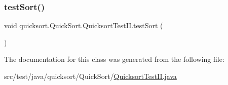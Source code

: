 \subsubsection{\texorpdfstring{test\+Sort()}{testSort()}}
{\footnotesize\ttfamily void quicksort.\+Quick\+Sort.\+Quicksort\+Test\+I\+I.\+test\+Sort (\begin{DoxyParamCaption}{ }\end{DoxyParamCaption})}



The documentation for this class was generated from the following file\+:\begin{DoxyCompactItemize}
\item 
src/test/java/quicksort/\+Quick\+Sort/\hyperlink{_quicksort_test_i_i_8java}{Quicksort\+Test\+I\+I.\+java}\end{DoxyCompactItemize}
